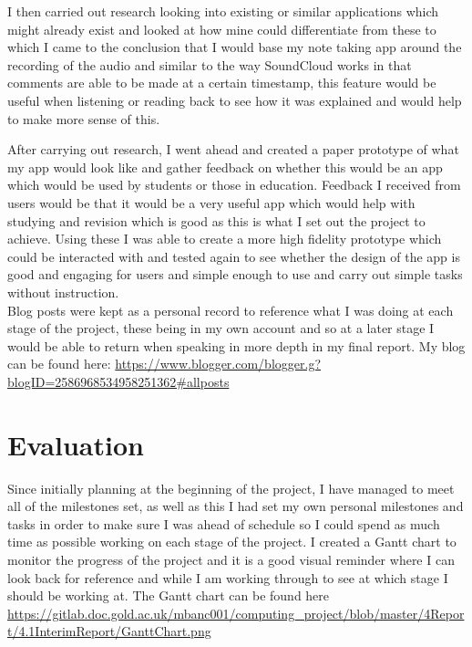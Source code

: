 \documentclass{report}
\begin{document}
\par I then carried out research looking into existing or similar applications which might already exist and looked at how mine could differentiate from these to which I came to the conclusion that I would base my note taking app around the recording of the audio and similar to the way SoundCloud works in that comments are able to be made at a certain timestamp, this feature would be useful when listening or reading back to see how it was explained and would help to make more sense of this.\\

\par After carrying out research, I went ahead and created a paper prototype of what my app would look like and gather feedback on whether this would be an app which would be used by students or those in education. Feedback I received from users would be that it would be a very useful app which would help with studying and revision which is good as this is what I set out the project to achieve. Using these I was able to create a more high fidelity prototype which could be interacted with and tested again to see whether the design of the app is good and engaging for users and simple enough to use and carry out simple tasks without instruction. \\

Blog posts were kept as a personal record to reference what I was doing at each stage of the project, these being in my own account and so at a later stage I would be able to return when speaking in more depth in my final report. My blog can be found here: \url{https://www.blogger.com/blogger.g?blogID=2586968534958251362#allposts}

\chapter*{Evaluation}
Since initially planning at the beginning of the project, I have managed to meet all of the milestones set, as well as this I had set my own personal milestones and tasks in order to make sure I was ahead of schedule so I could spend as much time as possible working on each stage of the project. I created a Gantt chart to monitor the progress of the project and it is a good visual reminder where I can look back for reference and while I am working through to see at which stage I should be working at. The Gantt chart can be found here \url{https://gitlab.doc.gold.ac.uk/mbanc001/computing_project/blob/master/4Report/4.1InterimReport/GanttChart.png}\\
\end{document}
